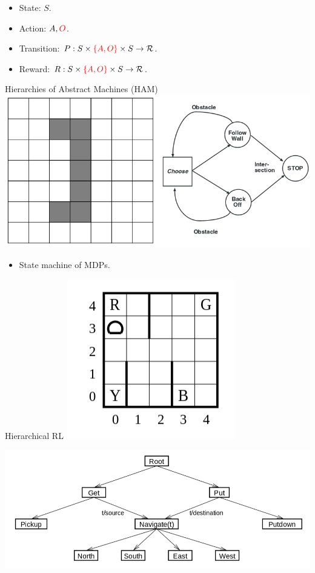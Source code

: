 \begin{itemize}
  \item State: $S$.
  \item Action: $A, {\color{red}O}$.
  \item Transition: $P: S \times {\color{red}\{A, O\}} \times S \rightarrow \mathcal{R}$.
  \item Reward: $R: S \times {\color{red}\{A, O\}} \times S \rightarrow \mathcal{R}$.
\end{itemize}



Hierarchies of Abstract Machines (HAM)
\includegraphics[width=0.8\columnwidth]{ham.png}
\begin{itemize}
  \item State machine of MDPs.
\end{itemize}



Hierarchical RL
\includegraphics[width=0.4\columnwidth]{taxi.png}

\includegraphics[width=0.8\columnwidth]{maxq.png}



